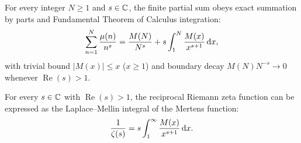 \begin{lemma}
\label{lem:abel_mertens_identity}
\leanok
For every integer $N \ge 1$ and $s \in \mathbb{C}$, the finite partial sum obeys exact summation by parts and Fundamental Theorem of Calculus integration:
$$\sum_{n=1}^N \frac{\mu(n)}{n^s} = \frac{M(N)}{N^s} + s \int_1^N \frac{M(x)}{x^{s+1}} \, \mathrm{d} x,$$
with trivial bound $|M(x)| \le x$ ($x \ge 1$) and boundary decay $M(N) N^{-s} \to 0$ whenever $\operatorname{Re}(s) > 1$.
\end{lemma}

\begin{lemma}
\label{lem:mellin_reciprocal_zeta}
\leanok
For every $s \in \mathbb{C}$ with $\operatorname{Re}(s) > 1$, the reciprocal Riemann zeta function can be expressed as the Laplace--Mellin integral of the Mertens function:
\begin{equation}
\label{eq:reciprocal_mellin}
\frac{1}{\zeta(s)} = s \int_1^\infty \frac{M(x)}{x^{s+1}} \, \mathrm{d} x.
\end{equation}
\end{lemma}


